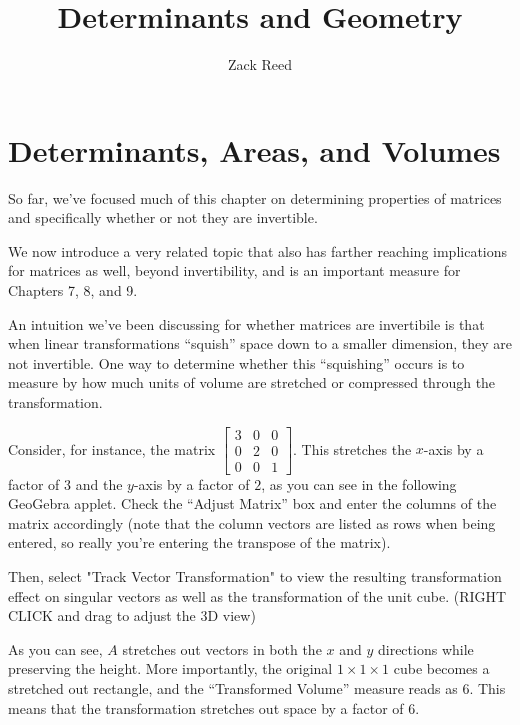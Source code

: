 \documentclass{ximera}
\author{Zack Reed}
\title{Determinants and Geometry}
\begin{document}
\begin{abstract}

\end{abstract}
\maketitle


\section*{Determinants, Areas, and Volumes}

So far, we've focused much of this chapter on determining properties of matrices and specifically whether or not they are invertible. 

We now introduce a very related topic that also has farther reaching implications for matrices as well, beyond invertibility, and is an important measure for Chapters 7, 8, and 9.

An intuition we've been discussing for whether matrices are invertibile is that when linear transformations ``squish'' space down to a smaller dimension, they are not invertible. One way to determine whether this ``squishing'' occurs is to measure by how much units of volume are stretched or compressed through the transformation. 

Consider, for instance, the matrix $\begin{bmatrix}
  3&0&0\\0&2&0\\0&0&1
\end{bmatrix}$. This stretches the $x$-axis by a factor of $3$ and the $y$-axis by a factor of $2$, as you can see in the following GeoGebra applet. Check the ``Adjust Matrix'' box and enter the columns of the matrix accordingly (note that the column vectors are listed as rows when being entered, so really you're entering the transpose of the matrix).

Then, select "Track Vector Transformation" to view the resulting transformation effect on singular vectors as well as the transformation of the unit cube. (RIGHT CLICK and drag to adjust the 3D view)

\begin{center}
\end{center}

As you can see, $A$ stretches out vectors in both the $x$ and $y$ directions while preserving the height. More importantly, the original $1\times1\times1$ cube becomes a stretched out rectangle, and the ``Transformed Volume'' measure reads as $6$. This means that the transformation stretches out space by a factor of $6$. 
\end{document}
